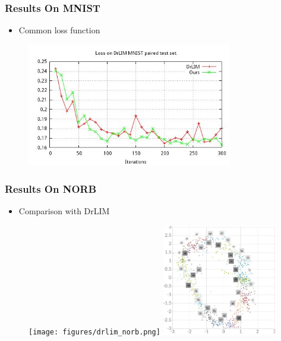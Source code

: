 \documentclass[10pt]{beamer}
\begin{document}
\begin{frame}
    \frametitle{Results On MNIST}
    \begin{itemize}
        \item Common loss function
    \end{itemize}

    \begin{figure}[h]
        \begin{center}
            \includegraphics[width=0.8\textwidth]{../report/thesis_figures/final_loss_test2bv7.jpg}
        \end{center}
    \end{figure}
\end{frame}


\begin{frame}
    \frametitle{Results On NORB}
    \begin{itemize}
        \item Comparison with DrLIM
    \end{itemize}


    \begin{figure}[h]
        \begin{center}
            \texttt{[image: figures/drlim\_norb.png]}
            \vspace{1cm}
            \includegraphics[width=0.45\textwidth]{../report/thesis_figures/norb_cl2d.jpg}
        \end{center}
    \end{figure}
\end{frame}
\end{document}

